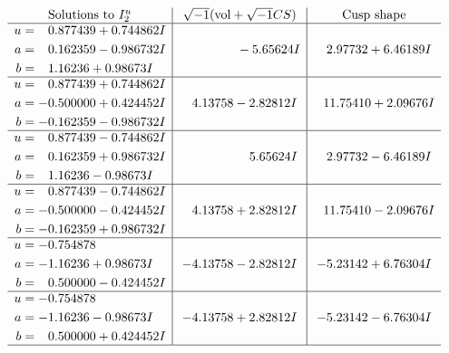 \documentclass[1p]{elsarticle_modified}
\theoremstyle{definition}
\newcommand{\I}{\sqrt{-1}}
\begin{document}
$$\begin{array}{c|c|c}  
\text{Solutions to }I^u_{2}& \I (\text{vol} + \sqrt{-1}CS) & \text{Cusp shape}\\
 \hline 
\begin{aligned}
u &= \phantom{-}0.877439 + 0.744862 I \\
a &= \phantom{-}0.162359 - 0.986732 I \\
b &= \phantom{-}1.16236 + 0.98673 I\end{aligned}
 & \phantom{-0.000000 } -5.65624 I & \phantom{-}2.97732 + 6.46189 I \\ \hline\begin{aligned}
u &= \phantom{-}0.877439 + 0.744862 I \\
a &= -0.500000 + 0.424452 I \\
b &= -0.162359 - 0.986732 I\end{aligned}
 & \phantom{-}4.13758 - 2.82812 I & \phantom{-}11.75410 + 2.09676 I \\ \hline\begin{aligned}
u &= \phantom{-}0.877439 - 0.744862 I \\
a &= \phantom{-}0.162359 + 0.986732 I \\
b &= \phantom{-}1.16236 - 0.98673 I\end{aligned}
 & \phantom{-0.000000 -}5.65624 I & \phantom{-}2.97732 - 6.46189 I \\ \hline\begin{aligned}
u &= \phantom{-}0.877439 - 0.744862 I \\
a &= -0.500000 - 0.424452 I \\
b &= -0.162359 + 0.986732 I\end{aligned}
 & \phantom{-}4.13758 + 2.82812 I & \phantom{-}11.75410 - 2.09676 I \\ \hline\begin{aligned}
u &= -0.754878\phantom{ +0.000000I} \\
a &= -1.16236 + 0.98673 I \\
b &= \phantom{-}0.500000 - 0.424452 I\end{aligned}
 & -4.13758 - 2.82812 I & -5.23142 + 6.76304 I \\ \hline\begin{aligned}
u &= -0.754878\phantom{ +0.000000I} \\
a &= -1.16236 - 0.98673 I \\
b &= \phantom{-}0.500000 + 0.424452 I\end{aligned}
 & -4.13758 + 2.82812 I & -5.23142 - 6.76304 I\\
 \hline 
 \end{array}$$\newpage\newpage\renewcommand{\arraystretch}{1}
\end{document}
